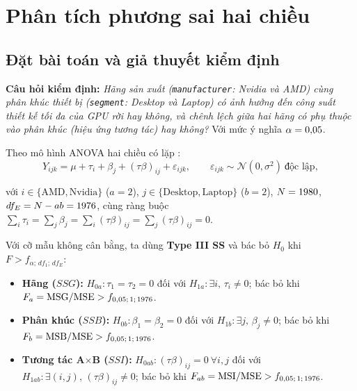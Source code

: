 %
%   

\section{Phân tích phương sai hai chiều}
\label{sec:anova_two_way}

\subsection{Đặt bài toán và giả thuyết kiểm định}

\textbf{Câu hỏi kiểm định:} \emph{Hãng sản xuất (\texttt{manufacturer}: Nvidia và AMD)
cùng phân khúc thiết bị (\texttt{segment}: Desktop và Laptop) có ảnh hưởng đến công suất
thiết kế tối đa của GPU rời hay không, và chênh lệch giữa hai hãng có phụ thuộc vào phân
khúc (hiệu ứng tương tác) hay không?} Với  mức ý nghĩa $\alpha = 0{,}05$.

Theo mô hình ANOVA hai chiều có lặp :
\begin{equation}
  Y_{ijk} = \mu + \tau_i + \beta_j + (\tau\beta)_{ij} + \varepsilon_{ijk},
  \qquad \varepsilon_{ijk} \sim \mathcal{N}(0, \sigma^2)\ \text{độc lập},
  \label{eq:two_way_anova}
\end{equation}
{\sloppy với $i \in \{\text{AMD}, \text{Nvidia}\}$ ($a=2$), $j \in \{\text{Desktop},
\text{Laptop}\}$ ($b=2$), $N = 1980$, $df_E = N - ab = 1976$, cùng ràng buộc
$\sum_i \tau_i = \sum_j \beta_j = \sum_i (\tau\beta)_{ij} = \sum_j (\tau\beta)_{ij} = 0$.

Với cỡ mẫu không cân bằng, ta dùng \textbf{Type III SS} và bác bỏ $H_0$ khi $F >
f_{\alpha;\, df_1;\, df_E}$:\par}
\begin{itemize}\setlength{\itemsep}{1pt}\setlength{\parskip}{0pt}
  \item \textbf{Hãng ($SSG$):} $H_{0a}: \tau_1 = \tau_2 = 0$ đối với $H_{1a}: \exists i,\,
    \tau_i \neq 0$; bác bỏ khi $F_a = \mathrm{MSG}/\mathrm{MSE} >
    f_{0{,}05;\, 1;\, 1976}$.
  \item \textbf{Phân khúc ($SSB$):} $H_{0b}: \beta_1 = \beta_2 = 0$ đối với $H_{1b}:
    \exists j,\, \beta_j \neq 0$; bác bỏ khi $F_b = \mathrm{MSB}/\mathrm{MSE} >
    f_{0{,}05;\, 1;\, 1976}$.
  \item \textbf{Tương tác A$\times$B ($SSI$):} $H_{0ab}: (\tau\beta)_{ij} = 0\ \forall i,j$
    đối với $H_{1ab}: \exists (i,j),\, (\tau\beta)_{ij} \neq 0$; bác bỏ khi $F_{ab} =
    \mathrm{MSI}/\mathrm{MSE} > f_{0{,}05;\, 1;\, 1976}$.
\end{itemize}


